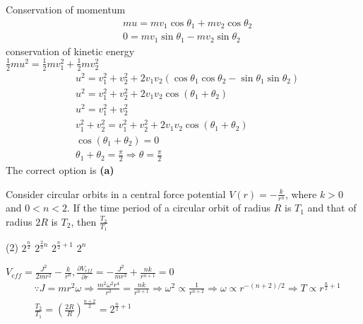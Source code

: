 \begin{enumerate}
\begin{answer}
Conservation of momentum
\begin{align*}
&m u=m v_{1} \cos \theta_{1}+m v_{2} \cos \theta_{2} \\
&0=m v_{1} \sin \theta_{1}-m v_{2} \sin \theta_{2}
\end{align*}
conservation of kinetic energy\\
$
\frac{1}{2} m u^{2}=\frac{1}{2} m v_{1}^{2}+\frac{1}{2} m v_{2}^{2}
$
\begin{align*}
	&u^{2}=v_{1}^{2}+v_{2}^{2}+2 v_{1} v_{2}\left(\cos \theta_{1} \cos \theta_{2}-\sin \theta_{1} \sin \theta_{2}\right) \\
	&u^{2}=v_{1}^{2}+v_{2}^{2}+2 v_{1} v_{2} \cos \left(\theta_{1}+\theta_{2}\right) \\
	&u^{2}=v_{1}^{2}+v_{2}^{2} \\
	&v_{1}^{2}+v_{2}^{2}=v_{1}^{2}+v_{2}^{2}+2 v_{1} v_{2} \cos \left(\theta_{1}+\theta_{2}\right) \\
	&\cos \left(\theta_{1}+\theta_{2}\right)=0 \\
	&\theta_{1}+\theta_{2}=\frac{\pi}{2} \Rightarrow \theta=\frac{\pi}{2}
\end{align*}
The correct option is \textbf{(a)}	
\end{answer}
\begin{minipage}{\textwidth}
	\item Consider circular orbits in a central force potential $V(r)=-\frac{k}{r^{n}}$, where $k>0$ and $0<n<2$. If the time period of a circular orbit of radius $R$ is $T_{1}$ and that of radius $2 R$ is $T_{2}$, then $\frac{T_{2}}{T_{1}}$
\end{minipage}
\begin{tasks}(2)
	\task[\textbf{A.}] $2^{\frac{n}{2}}$
	\task[\textbf{B.}]$2^{\frac{2}{3} n}$
	\task[\textbf{C.}]$2^{\frac{n}{2}+1}$
	\task[\textbf{D.}]$2^{n}$
\end{tasks}
\begin{answer}
	$V_{e f f}=\frac{J^{2}}{2 m r^{2}}-\frac{k}{r^{n}}, \frac{\partial V_{e f f}}{\partial r}=-\frac{J^{2}}{m r^{3}}+\frac{n k}{r^{n+1}}=0$\\
	\begin{align*}
		&\because J=m r^{2} \omega \Rightarrow \frac{m^{2} \omega^{2} r^{4}}{r^{3}}=\frac{n k}{r^{n+1}} \Rightarrow \omega^{2} \propto \frac{1}{r^{n+2}} \Rightarrow \omega \propto r^{-(n+2) / 2} \Rightarrow T \propto r^{\frac{n}{2}+1} \\
		&\frac{T_{2}}{T_{1}}=\left(\frac{2 R}{R}\right)^{\frac{n+2}{2}}=2^{\frac{n}{2}+1}

\end{align*}
\end{answer}
\end{enumerate}
